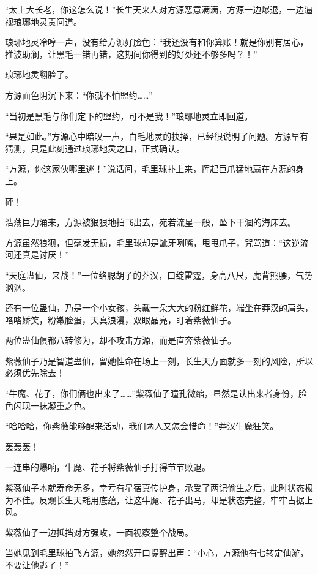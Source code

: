 
\begin{this_body}

“太上大长老，你这怎么说！”长生天来人对方源恶意满满，方源一边爆退，一边逼视琅琊地灵责问道。

琅琊地灵冷哼一声，没有给方源好脸色：“我还没有和你算账！就是你别有居心，推波助澜，让黑毛一错再错，这期间你得到的好处还不够多吗？！”

琅琊地灵翻脸了。

方源面色阴沉下来：“你就不怕盟约……”

“当初是黑毛与你们定下的盟约，可不是我！”琅琊地灵立即回道。

“果是如此。”方源心中暗叹一声，白毛地灵的抉择，已经很说明了问题。方源早有猜测，只是此刻通过琅琊地灵之口，正式确认。

“方源，你这家伙哪里逃！”说话间，毛里球扑上来，挥起巨爪猛地扇在方源的身上。

砰！

浩荡巨力涌来，方源被狠狠地拍飞出去，宛若流星一般，坠下干涸的海床去。

方源虽然狼狈，但毫发无损，毛里球却是龇牙咧嘴，甩甩爪子，咒骂道：“这逆流河还真是讨厌！”

“天庭蛊仙，来战！”一位络腮胡子的莽汉，口绽雷霆，身高八尺，虎背熊腰，气势汹汹。

还有一位蛊仙，乃是一个小女孩，头戴一朵大大的粉红鲜花，端坐在莽汉的肩头，咯咯娇笑，粉嫩脸蛋，天真浪漫，双眼晶亮，盯着紫薇仙子。

两位蛊仙俱都八转修为，却不攻击方源，而是直奔紫薇仙子。

紫薇仙子乃是智道蛊仙，留她性命在场上一刻，长生天方面就多一刻的风险，所以必须优先除去！

“牛魔、花子，你们俩也出来了……”紫薇仙子瞳孔微缩，显然是认出来者身份，脸色闪现一抹凝重之色。

“哈哈哈，你紫薇能够醒来活动，我们两人又怎会惜命！”莽汉牛魔狂笑。

轰轰轰！

一连串的爆响，牛魔、花子将紫薇仙子打得节节败退。

紫薇仙子本就寿命无多，幸亏有星宿真传护身，承受了两记偷生之后，此时状态极为不佳。反观长生天耗用底蕴，让这牛魔、花子出马，却是状态完整，牢牢占据上风。

紫薇仙子一边抵挡对方强攻，一面视察整个战局。

当她见到毛里球拍飞方源，她忽然开口提醒出声：“小心，方源他有七转定仙游，不要让他逃了！”


\end{this_body}
